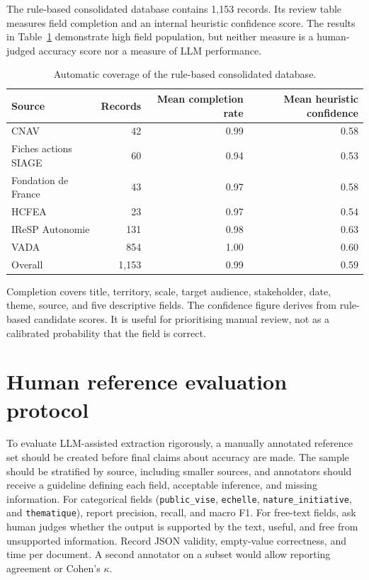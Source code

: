 The rule-based consolidated database contains 1,153 records. Its review table
measures field completion and an internal heuristic confidence score. The
results in Table~\ref{tab:coverage-results} demonstrate high field population,
but neither measure is a human-judged accuracy score nor a measure of LLM
performance.

\begin{table}[H]
\centering
\begin{tabular}{lrrr}
\toprule
Source & Records & Mean completion rate & Mean heuristic confidence \\
\midrule
CNAV & 42 & 0.99 & 0.58 \\
Fiches actions SIAGE & 60 & 0.94 & 0.53 \\
Fondation de France & 43 & 0.97 & 0.58 \\
HCFEA & 23 & 0.97 & 0.54 \\
IReSP Autonomie & 131 & 0.98 & 0.63 \\
VADA & 854 & 1.00 & 0.60 \\
\midrule
Overall & 1,153 & 0.99 & 0.59 \\
\bottomrule
\end{tabular}
\caption{Automatic coverage of the rule-based consolidated database.}
\label{tab:coverage-results}
\end{table}

Completion covers title, territory, scale, target audience, stakeholder, date,
theme, source, and five descriptive fields. The confidence figure derives from
rule-based candidate scores. It is useful for prioritising manual review, not as
a calibrated probability that the field is correct.

\section{Human reference evaluation protocol}

To evaluate LLM-assisted extraction rigorously, a manually annotated reference
set should be created before final claims about accuracy are made. The sample
should be stratified by source, including smaller sources, and annotators should
receive a guideline defining each field, acceptable inference, and missing
information. For categorical fields (\texttt{public\_vise}, \texttt{echelle},
\texttt{nature\_initiative}, and \texttt{thematique}), report precision,
recall, and macro F1. For free-text fields, ask human judges whether the output
is supported by the text, useful, and free from unsupported information. Record
JSON validity, empty-value correctness, and time per document. A second
annotator on a subset would allow reporting agreement or Cohen's $\kappa$.


